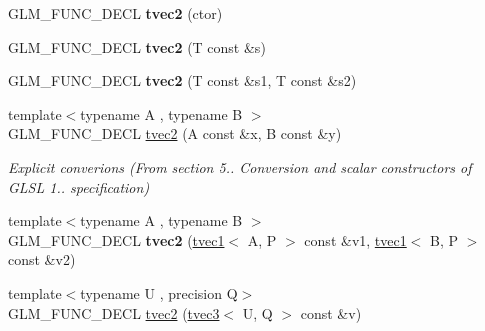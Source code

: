 \begin{DoxyCompactItemize}
\item 
\hypertarget{structglm_1_1tvec2_a0bff52067abf2c6333c7b498e4067db4}{G\-L\-M\-\_\-\-F\-U\-N\-C\-\_\-\-D\-E\-C\-L {\bfseries tvec2} (ctor)}\label{structglm_1_1tvec2_a0bff52067abf2c6333c7b498e4067db4}

\item 
\hypertarget{structglm_1_1tvec2_a8f47e5b2e5d3c078cedb407b416f1f07}{G\-L\-M\-\_\-\-F\-U\-N\-C\-\_\-\-D\-E\-C\-L {\bfseries tvec2} (T const \&s)}\label{structglm_1_1tvec2_a8f47e5b2e5d3c078cedb407b416f1f07}

\item 
\hypertarget{structglm_1_1tvec2_a240f0e106b725237513d2128c53e798e}{G\-L\-M\-\_\-\-F\-U\-N\-C\-\_\-\-D\-E\-C\-L {\bfseries tvec2} (T const \&s1, T const \&s2)}\label{structglm_1_1tvec2_a240f0e106b725237513d2128c53e798e}

\item 
\hypertarget{structglm_1_1tvec2_a100b3001f4ba3e898f6dbef516310e68}{{\footnotesize template$<$typename A , typename B $>$ }\\G\-L\-M\-\_\-\-F\-U\-N\-C\-\_\-\-D\-E\-C\-L \hyperlink{structglm_1_1tvec2_a100b3001f4ba3e898f6dbef516310e68}{tvec2} (A const \&x, B const \&y)}\label{structglm_1_1tvec2_a100b3001f4ba3e898f6dbef516310e68}

\begin{DoxyCompactList}\small\item\em Explicit converions (From section 5.. Conversion and scalar constructors of G\-L\-S\-L 1.. specification) \end{DoxyCompactList}\item 
\hypertarget{structglm_1_1tvec2_a235db039294c64b2b05b42f8a6b65ffe}{{\footnotesize template$<$typename A , typename B $>$ }\\G\-L\-M\-\_\-\-F\-U\-N\-C\-\_\-\-D\-E\-C\-L {\bfseries tvec2} (\hyperlink{structglm_1_1tvec1}{tvec1}$<$ A, P $>$ const \&v1, \hyperlink{structglm_1_1tvec1}{tvec1}$<$ B, P $>$ const \&v2)}\label{structglm_1_1tvec2_a235db039294c64b2b05b42f8a6b65ffe}

\item 
\hypertarget{structglm_1_1tvec2_a9b2fdfe551a1905a663122f78b918728}{{\footnotesize template$<$typename U , precision Q$>$ }\\G\-L\-M\-\_\-\-F\-U\-N\-C\-\_\-\-D\-E\-C\-L \hyperlink{structglm_1_1tvec2_a9b2fdfe551a1905a663122f78b918728}{tvec2} (\hyperlink{structglm_1_1tvec3}{tvec3}$<$ U, Q $>$ const \&v)}\label{structglm_1_1tvec2_a9b2fdfe551a1905a663122f78b918728}


\end{DoxyCompactItemize}
